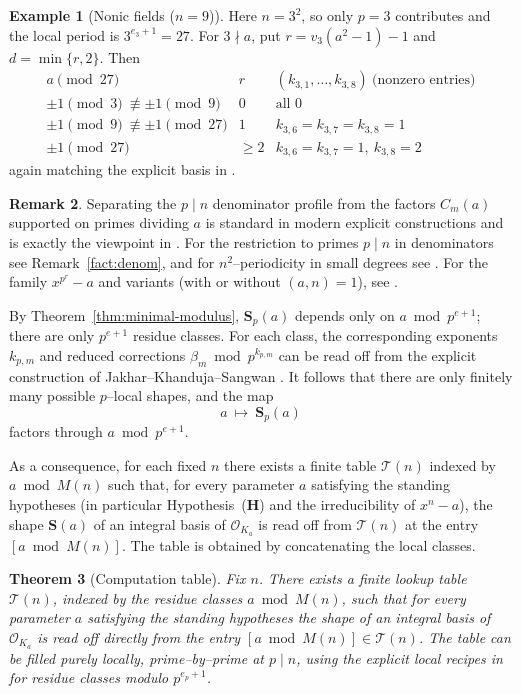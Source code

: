 \documentclass[12pt,a4paper,oneside]{amsart}
\newtheorem{theorem}{Theorem}[section]
\theoremstyle{definition}
\newtheorem{remark}[theorem]{Remark}
\newtheorem{example}[theorem]{Example}
\begin{document}
\begin{example}[Nonic fields ($n=9$)]
Here $n=3^2$, so only $p=3$ contributes and the local period is $3^{e_3+1}=27$.
For $3\nmid a$, put $r=v_3(a^2-1)-1$ and $d=\min\{r,2\}$.  Then
\[
\begin{array}{c|c|c}
a\!\!\!\pmod{27} & r & (k_{3,1},\dots,k_{3,8})\ \text{(nonzero entries)}\\ \hline
\pm1\!\!\pmod3\ \not\equiv \pm1\!\!\pmod9 & 0 & \text{all }0\\
\pm1\!\!\pmod9\ \not\equiv \pm1\!\!\pmod{27} & 1 & k_{3,6}=k_{3,7}=k_{3,8}=1\\
\pm1\!\!\pmod{27} & \ge2 & k_{3,6}=k_{3,7}=1,\ k_{3,8}=2
\end{array}
\]
again matching the explicit basis in \cite{JKS21}.  
\end{example} 

\begin{remark}
Separating the $p\mid n$ denominator profile from the factors $C_m(a)$ supported on primes
dividing $a$ is standard in modern explicit constructions and is exactly the viewpoint in
\cite{JKS21}.  For the restriction to primes $p\mid n$ in denominators see Remark~\ref{fact:denom}, and for $n^2$–periodicity in small degrees see \cite{GR17}.  For the family $x^{p^r}-a$ and variants (with or without $(a,n)=1$), see \cite{Kch24}. 
\end{remark}

By Theorem~\ref{thm:minimal-modulus}, $\mathbf S_p(a)$ depends only on $a\bmod p^{e+1}$; there are only
$p^{e+1}$ residue classes. For each class, the corresponding exponents $k_{p,m}$ and reduced corrections
$\beta_m\bmod p^{k_{p,m}}$ can be read off from the explicit construction of
Jakhar--Khanduja--Sangwan \cite[Theorem~1.6 and Theorem~1.8]{JKS21}. It follows that there are only finitely
many possible $p$--local shapes, and the map
\[
a\ \mapsto\ \mathbf S_p(a)
\]
factors through $a\bmod p^{e+1}$.

As a consequence, for each fixed $n$ there exists a finite table $\mathcal T(n)$ indexed by $a\bmod M(n)$ such that, for every parameter $a$ satisfying the standing hypotheses (in particular Hypothesis~\textup{(\textbf{H})} and the irreducibility of $x^n-a$), the shape $\mathbf S(a)$ of an integral basis of $\mathcal O_{K_a}$ is read off from $\mathcal T(n)$ at the entry $[a\bmod M(n)]$. The table is obtained by concatenating the local classes.

\begin{theorem}[Computation table]\label{thm:precompute}
Fix $n$. There exists a finite lookup table $\mathcal T(n)$, indexed by the residue classes $a\bmod M(n)$, such that for every parameter $a$ satisfying the standing hypotheses the shape of an integral basis of $\mathcal O_{K_a}$ is read off directly from the entry $[a\bmod M(n)]\in\mathcal T(n)$.  The table can be filled purely locally, prime–by–prime at $p\mid n$, using the explicit local recipes in \cite{JKS21} for residue classes modulo $p^{e_p+1}$.

\end{theorem}
\end{document}
